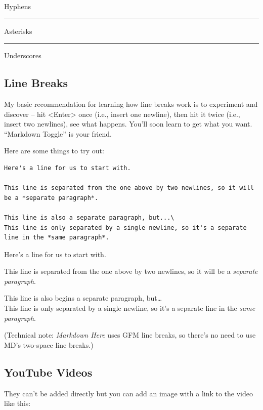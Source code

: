 \documentclass[
]{article}
\begin{document}
Hyphens

\begin{center}\rule{0.5\linewidth}{0.5pt}\end{center}

Asterisks

\begin{center}\rule{0.5\linewidth}{0.5pt}\end{center}

Underscores

\subsection{Line Breaks}\label{line-breaks}

My basic recommendation for learning how line breaks work is to
experiment and discover -- hit \textless Enter\textgreater{} once (i.e.,
insert one newline), then hit it twice (i.e., insert two newlines), see
what happens. You'll soon learn to get what you want. ``Markdown
Toggle'' is your friend.

Here are some things to try out:

\begin{verbatim}
Here's a line for us to start with.

This line is separated from the one above by two newlines, so it will be a *separate paragraph*.

This line is also a separate paragraph, but...\
This line is only separated by a single newline, so it's a separate line in the *same paragraph*.
\end{verbatim}

Here's a line for us to start with.

This line is separated from the one above by two newlines, so it will be
a \emph{separate paragraph}.

This line is also begins a separate paragraph, but\ldots{}\\
This line is only separated by a single newline, so it's a separate line
in the \emph{same paragraph}.

(Technical note: \emph{Markdown Here} uses GFM line breaks, so there's
no need to use MD's two-space line breaks.)

\subsection{YouTube Videos}\label{youtube-videos}

They can't be added directly but you can add an image with a link to the
video like this:
\end{document}
